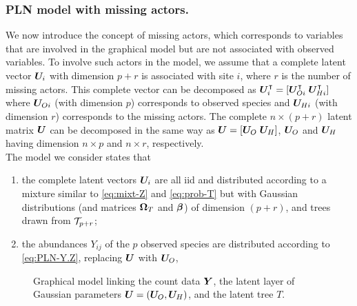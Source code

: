 \subsubsection*{PLN model with missing actors.} 
We now introduce the concept of missing actors, which corresponds to variables that are involved in the graphical model but are not associated with observed variables. To involve such actors in the model, we assume that a complete latent vector ${\boldsymbol{U}}_i$ with dimension $p+r$ is associated with site $i$, where $r$ is the number of missing actors. This complete vector can be decomposed as ${\boldsymbol{U}}_i^\intercal = [{\boldsymbol{U}}_{Oi}^\intercal \; {\boldsymbol{U}}_{Hi}^\intercal]$ where ${\boldsymbol{U}}_{Oi}$ (with dimension $p$) corresponds to observed species and ${\boldsymbol{U}}_{Hi}$ (with dimension $r$) corresponds to the missing actors.
The complete $n \times (p+r)$ latent matrix ${\boldsymbol{U}}$ can be decomposed in the same way as ${\boldsymbol{U}} = [{\boldsymbol{U}}_O \; {\boldsymbol{U}}_H]$, ${\boldsymbol{U}}_O$ and ${\boldsymbol{U}}_H$ having dimension $n \times p$ and $n \times r$, respectively. \\ 
The model we consider states that
\begin{enumerate}[label=\roman*]
\item the complete latent vectors ${\boldsymbol{U}}_i$ are all iid and distributed according to a mixture similar to \eqref{eq:mixt-Z} and \eqref{eq:prob-T} but with Gaussian distributions (and matrices ${\boldsymbol{\Omega}}_T$ and ${\boldsymbol{\beta}}$) of dimension $(p+r)$, and trees drawn from ${\mathcal{T}}_{p+r}$;
\item  the abundances $Y_{ij}$ of the  $p$ observed species are distributed according to \eqref{eq:PLN-Y.Z}, replacing ${\boldsymbol{U}}$ with ${\boldsymbol{U}}_O$,
\end{enumerate}

\begin{figure}[H]
 \begin{center}
 \caption{Graphical model linking the count data ${\boldsymbol{Y}}$, the latent layer of Gaussian parameters ${\boldsymbol{U}}=({\boldsymbol{U}}_O,{\boldsymbol{U}}_H)$, and the latent tree $T$.}
  \label{fig:MGmodel}
    \end{center}
\end{figure}


